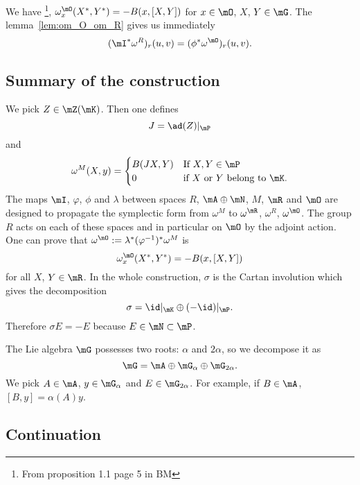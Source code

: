We have \footnote{From proposition 1.1 page 5 in BM}, $\omega_x^{\mO}(X^*,Y^*)=-B(x,[X,Y])$ for $x\in\mO$, $X$, $Y\in\mG$. The lemma~\ref{lem:om_O_om_R} gives us immediately
\[
	(\mI^*\omega^R)_r(u,v)=(\phi^*\omega^{\mO})_r(u,v).
\]
\subsection{Summary of the construction}

We pick $Z\in\mZ(\mK)$. Then one defines
\[
	J=\ad(Z)|_{\mP}
\]
and
\[
	\omega^M(X,y)=
	\begin{cases}
		B(JX,Y) & \text{If }X,Y\in\mP                              \\
		0       & \text{if }X \text{ or } Y \text{ belong to }\mK.
	\end{cases}
\]
The maps $\mI$, $\varphi$, $\phi$ and $\lambda$ between spaces $R$, $\mA\oplus\mN$, $M$, $\mR$ and $\mO$ are designed to propagate the symplectic form from $\omega^M$ to $\omega^{\mR}$, $\omega^R$, $\omega^{\mO}$. The group $R$ acts on each of these spaces and in particular on $\mO$ by the adjoint action. One can prove that $\omega^{\mO}:=\lambda^*(\varphi^{-1})^*\omega^M$ is
\[
	\omega^{\mO}_x(X^*,Y^*)=-B(x,[X,Y])
\]
for all $X$, $Y\in\mR$. In the whole construction, $\sigma$ is the Cartan involution which gives the decomposition
\[
	\sigma=\id|_{\mK}\oplus(-\id)|_{\mP}.
\]
Therefore $\sigma E=-E$ because $E\in\mN\subset\mP$.

The Lie algebra $\mG$ possesses two roots: $\alpha$ and $2\alpha$, so we decompose it as
\[
	\mG=\mA\oplus\mG_{\alpha}\oplus\mG_{2\alpha}.
\]
We pick $A\in\mA$, $y\in\mG_{\alpha}$ and $E\in\mG_{2\alpha}$. For example, if $B\in \mA$, $[B,y]=\alpha(A)y$.

\subsection{Continuation}

